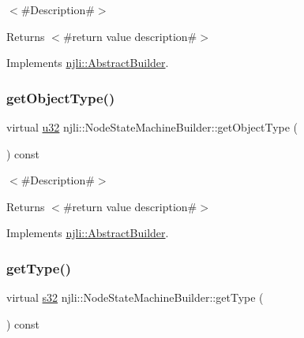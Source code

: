 $<$\#\+Description\#$>$

\begin{DoxyReturn}{Returns}
$<$\#return value description\#$>$ 
\end{DoxyReturn}


Implements \mbox{\hyperlink{classnjli_1_1_abstract_builder_a902f73ea78031b06aca183a417f3413b}{njli\+::\+Abstract\+Builder}}.

\mbox{\label{classnjli_1_1_node_state_machine_builder_a78362b9cab6be01d3161564f83c09b71}} 
\subsubsection{\texorpdfstring{get\+Object\+Type()}{getObjectType()}}
{\footnotesize\ttfamily virtual \mbox{\hyperlink{_util_8h_a10e94b422ef0c20dcdec20d31a1f5049}{u32}} njli\+::\+Node\+State\+Machine\+Builder\+::get\+Object\+Type (\begin{DoxyParamCaption}{ }\end{DoxyParamCaption}) const\hspace{0.3cm}{\ttfamily [virtual]}}

$<$\#\+Description\#$>$

\begin{DoxyReturn}{Returns}
$<$\#return value description\#$>$ 
\end{DoxyReturn}


Implements \mbox{\hyperlink{classnjli_1_1_abstract_builder_a0f2d344fcf697b167f4f2b1122b5fb33}{njli\+::\+Abstract\+Builder}}.

\mbox{\label{classnjli_1_1_node_state_machine_builder_aa7f35477df5acf3543d1abcbff213d18}} 
\subsubsection{\texorpdfstring{get\+Type()}{getType()}}
{\footnotesize\ttfamily virtual \mbox{\hyperlink{_util_8h_aa62c75d314a0d1f37f79c4b73b2292e2}{s32}} njli\+::\+Node\+State\+Machine\+Builder\+::get\+Type (\begin{DoxyParamCaption}{ }\end{DoxyParamCaption}) const\hspace{0.3cm}{\ttfamily [virtual]}}

